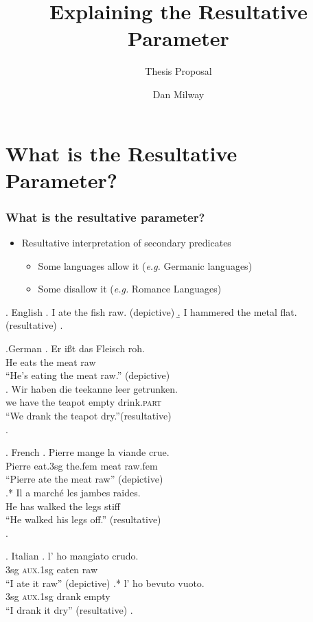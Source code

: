 \documentclass{article}
\title{Explaining the Resultative Parameter}
\subtitle{Thesis Proposal}
\author{Dan Milway}
\begin{document}
\section{}
\frame[plain]{\titlepage}
\section[What is the Resultative Parameter?]{What is the Resultative Parameter?}
\begin{frame}
  \frametitle{What is the resultative parameter?}
  \begin{itemize}
    \item Resultative interpretation of secondary predicates
      \begin{itemize}
	\item<1-> Some languages allow it (\textit{e.g.} Germanic languages)
	\item<4-> Some disallow it (\textit{e.g.} Romance Languages)
      \end{itemize}
  \end{itemize}
  \begin{overprint}
    \ex. English
    \a. I ate the fish raw. (depictive)
    \b. I hammered the metal flat. (resultative)
    \z.

    \ex.German 
    \ag. Er i\ss{}t das Fleisch roh.\\
    He eats the meat raw\\
    ``He's eating the meat raw.'' (depictive)\\
    \parencite{muller2004analysis}
    \bg. Wir haben die teekanne leer getrunken.\\
    we have the teapot empty drink.\textsc{part}\\
    ``We drank the teapot dry.''(resultative)\\
    \parencite{kratzer_building_2004}
    \z.

    \ex. French
    \ag. Pierre mange la viande crue.\\
    Pierre eat.3sg the.fem meat raw.fem\\
    ``Pierre ate the meat raw'' (depictive)\\
    \parencite{legendre1997secondary}
    \bg.* Il a march\'e les jambes raides.\\
    He has walked the legs stiff\\
    ``He walked his legs off.'' (resultative)\\
    \parencite{washio1997resultatives}
    \z.

    \ex. Italian
    \ag. l' ho mangiato crudo.\\
    3sg \textsc{aux}.1sg eaten raw\\
    ``I ate it raw'' (depictive)
    \bg.* l' ho bevuto vuoto.\\
    3sg \textsc{aux}.1sg drank empty\\
    ``I drank it dry'' (resultative)
    \z.

  \end{overprint}
\end{frame}
\end{document}
